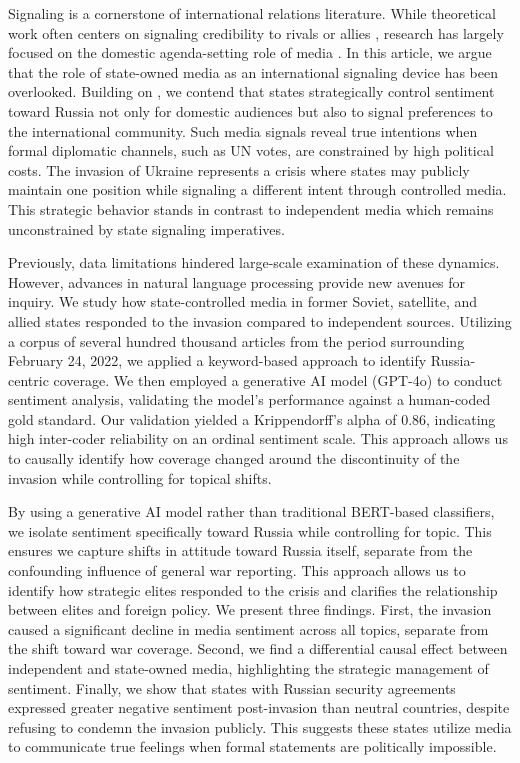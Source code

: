 \documentclass[12pt]{article}
\begin{document}
Signaling is a cornerstone of international relations literature. While theoretical work often centers on signaling credibility to rivals \citep{fearon_signaling_1997} or allies \citep{blankenship_trivial_2022}, research has largely focused on the domestic agenda-setting role of media \citep{mccombs_agenda-setting_2002}. In this article, we argue that the role of state-owned media as an international signaling device has been overlooked. Building on \citet{cohen_theatre_1987}, we contend that states strategically control sentiment toward Russia not only for domestic audiences but also to signal preferences to the international community. Such media signals reveal true intentions when formal diplomatic channels, such as UN votes, are constrained by high political costs. The invasion of Ukraine represents a crisis where states may publicly maintain one position while signaling a different intent through controlled media. This strategic behavior stands in contrast to independent media which remains unconstrained by state signaling imperatives.

Previously, data limitations hindered large-scale examination of these dynamics. However, advances in natural language processing provide new avenues for inquiry. We study how state-controlled media in former Soviet, satellite, and allied states responded to the invasion compared to independent sources. Utilizing a corpus of several hundred thousand articles from the period surrounding February 24, 2022, we applied a keyword-based approach to identify Russia-centric coverage. We then employed a generative AI model (GPT-4o) to conduct sentiment analysis, validating the model's performance against a human-coded gold standard. Our validation yielded a Krippendorff's alpha of 0.86, indicating high inter-coder reliability on an ordinal sentiment scale. This approach allows us to causally identify how coverage changed around the discontinuity of the invasion while controlling for topical shifts.

By using a generative AI model rather than traditional BERT-based classifiers, we isolate sentiment specifically toward Russia while controlling for topic. This ensures we capture shifts in attitude toward Russia itself, separate from the confounding influence of general war reporting. This approach allows us to identify how strategic elites responded to the crisis and clarifies the relationship between elites and foreign policy. We present three findings. First, the invasion caused a significant decline in media sentiment across all topics, separate from the shift toward war coverage. Second, we find a differential causal effect between independent and state-owned media, highlighting the strategic management of sentiment. Finally, we show that states with Russian security agreements expressed greater negative sentiment post-invasion than neutral countries, despite refusing to condemn the invasion publicly. This suggests these states utilize media to communicate true feelings when formal statements are politically impossible.


\newpage

\printbibliography

%
%
\end{document}
